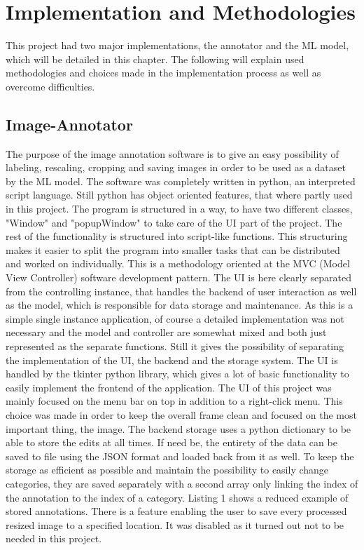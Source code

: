 \section{Implementation and Methodologies}

This project had two major implementations, the annotator and the ML model,
which will be detailed in this chapter. The following will explain used
methodologies and choices made in the implementation process as well as overcome
difficulties. 

\subsection{Image-Annotator}

The purpose of the image annotation software is to give an easy possibility of
labeling, rescaling, cropping and saving images in order to be used as a dataset
by the ML model.
\newline
The software was completely written in python, an interpreted script language.
Still python has object oriented features, that where partly used in this
project. 
\newline
The program is structured in a way, to have two different classes,
"Window" and "popupWindow" to take care of the UI part of the project. The rest
of the functionality is structured into script-like functions. This structuring
makes it easier to split the program into smaller tasks that can be distributed
and worked on individually. This is a methodology oriented at the MVC (Model
View Controller) software development pattern. The UI is here clearly separated
from the controlling instance, that handles the backend of user interaction as
well as the model, which is responsible for data storage and maintenance. As
this is a simple single instance application, of course a detailed
implementation was not necessary and the model and controller are somewhat mixed
and both just represented as the separate functions. Still it gives the
possibility of separating the implementation of the UI, the backend and the
storage system.
\newline
The UI is handled by the tkinter python library, which gives a lot of basic
functionality to easily implement the frontend of the application. The UI of
this project was mainly focused on the menu bar on top in addition to a
right-click menu. This choice was made in order to keep the overall frame clean
and focused on the most important thing, the image.
\newline
The backend storage uses a python dictionary to be able to store the edits at all times.
If need be, the entirety of the data can be saved to file using
the JSON format and loaded back from it as well. To keep the storage as
efficient as possible and maintain the possibility to easily change categories,
they are saved separately with a second array only linking the index of
the annotation to the index of a category. Listing 1 shows a reduced example of
stored annotations. There is a feature enabling the user to save every processed
resized image to a specified location. It was disabled as it turned out not to
be needed in this project. 


